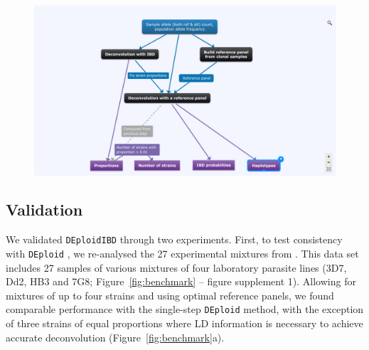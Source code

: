 \documentclass[9pt,lineno]{elife}
\begin{document}
\begin{figure}[ht]
{   }{\includegraphics[width=.8\textwidth]{scheme.pdf}}
\end{figure}


\subsection{Validation}

We validated \texttt{DEploidIBD} through two experiments.  First, to test consistency with \texttt{DEploid} \citet{Zhu2017}, we re-analysed the 27 experimental mixtures from \citep{Wendler2015}.  This data set includes 27 samples of various mixtures of four laboratory parasite lines (3D7, Dd2, HB3 and 7G8; Figure~\ref{fig:benchmark} – figure supplement 1).  Allowing for mixtures of up to four strains and using optimal reference panels, we found comparable performance with the single-step \texttt{DEploid} method, with the exception of three strains of equal proportions where LD information is necessary to achieve accurate deconvolution (Figure~\ref{fig:benchmark}a).
\end{document}
